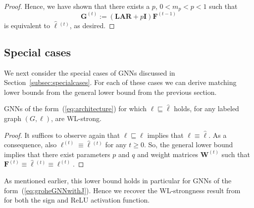\begin{proof}
Hence, we have shown that there exists a $p$, $0<m_p<p<1$ such that 
$$\mathbf{G}^{(t)}:=(\mathbf{L}\mathbf{A}\mathbf{R}+p\mathbf{I})\mathbf{F}^{(t-1)}$$
is equivalent to $\hat{\pmb{\ell}}{}^{(t)}$, as desired.

\end{proof}


\subsection{Special cases}
We next consider the special cases of GNNs discussed in Section~\ref{subsec:specialcases}.
For each of these cases we can derive matching lower bounds from the general lower bound from the previous section.

\begin{corollary}
GNNs of the form~(\ref{eq:architecture}) for which 
$\pmb{\ell}\sqsubseteq\hat{\pmb{\ell}}$ holds, for any labeled graph $(G,\pmb{\ell})$, are WL-strong.
\end{corollary}
\begin{proof}
It suffices to observe again that $\pmb{\ell}\sqsubseteq\hat{\pmb{\ell}}$  implies that
$\pmb{\ell}\equiv\hat{\pmb{\ell}}$. As a consequence, also $\pmb{\ell}^{(t)}\equiv\hat{\pmb{\ell}}{}^{(t)}$ for any $t\geq 0$. So, the general lower bound implies that there exist parameters $p$ and $q$ and weight matrices $\mathbf{W}^{(t)}$
such that $\mathbf{F}^{(t)}\equiv\hat{\pmb{\ell}}{}^{(t)}\equiv\pmb{\ell}^{(t)}$.
\end{proof}

As mentioned earlier, this lower bound holds in particular for GNNs of the form~(\ref{eq:groheGNNwithJ}). Hence we recover the WL-strongness result from~\cite{grohewl}
for both the sign and ReLU activation function.

